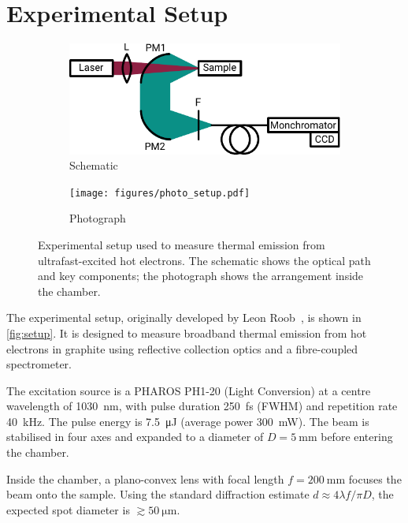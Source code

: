 \documentclass[
	parskip=half,
	a4paper,
]{scrarticle}
\begin{document}
\section{Experimental Setup}
\begin{figure}
    \centering
    \begin{subfigure}{3.5in}
        \centering
        \includegraphics{figures/setup.pdf}
        \caption{Schematic}
    \end{subfigure}\hfill
    \begin{subfigure}{2in}
        \centering
        \texttt{[image: figures/photo\_setup.pdf]}
        \caption{Photograph}
    \end{subfigure}
    \caption{Experimental setup used to measure thermal emission from ultrafast-excited hot electrons. The schematic shows the optical path and key components; the photograph shows the arrangement inside the chamber.}
    \label{fig:setup}
\end{figure}

The experimental setup, originally developed by Leon Roob~\cite{roobThermalRadiationUltrafast2025}, is shown in \autoref{fig:setup}. It is designed to measure broadband thermal emission from hot electrons in graphite using reflective collection optics and a fibre-coupled spectrometer.

The excitation source is a PHAROS PH1-20 (Light Conversion) at a centre wavelength of \SI{1030}{\nano\metre}, with pulse duration \SI{250}{\femto\second} (FWHM) and repetition rate \SI{40}{\kilo\hertz}. The pulse energy is \SI{7.5}{\micro\joule} (average power \SI{300}{\milli\watt}). The beam is stabilised in four axes and expanded to a diameter of $D=\SI{5}{\milli\metre}$ before entering the chamber.

Inside the chamber, a plano-convex lens with focal length \(f=\SI{200}{\milli\metre}\) focuses the beam onto the sample. Using the standard diffraction estimate \(d \approx 4\lambda f / \pi D\), the expected spot diameter is \(\gtrsim\SI{50}{\micro\metre}\).
\end{document}
